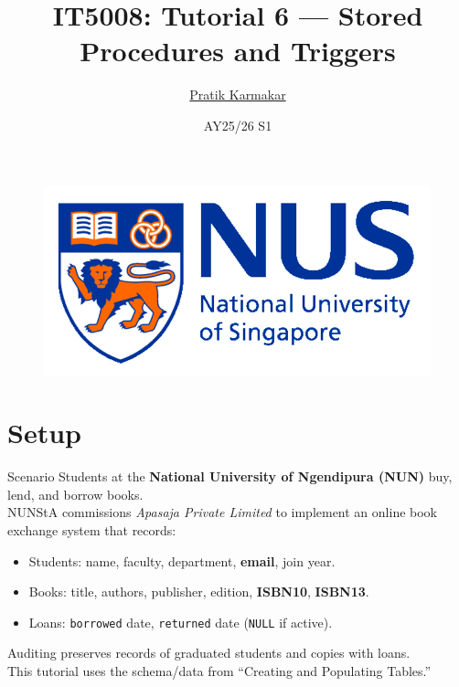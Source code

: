 \documentclass{beamer}
\author{\href{https://pratik2358.github.io/}{Pratik Karmakar}}
\title{IT5008: Tutorial 6 — Stored Procedures and Triggers}
\institute{
  School of Computing,\\
  National University of Singapore
}
\date{AY25/26 S1}
\begin{document}
\begin{frame}
  \titlepage
  \begin{figure}[htpb]
    \begin{center}
      \includegraphics[keepaspectratio, scale=0.18]{nus-logo.png}
    \end{center}
  \end{figure}
\end{frame}

\section{Setup}
\begin{frame}{Scenario}
\small
Students at the \textbf{National University of Ngendipura (NUN)} buy, lend, and borrow books.\\
NUNStA commissions \emph{Apasaja Private Limited} to implement an online book exchange system that records:
\begin{itemize}\itemsep3pt
  \item Students: name, faculty, department, \textbf{email}, join year.
  \item Books: title, authors, publisher, edition, \textbf{ISBN10}, \textbf{ISBN13}.
  \item Loans: \texttt{borrowed} date, \texttt{returned} date (\texttt{NULL} if active).
\end{itemize}
Auditing preserves records of graduated students and copies with loans.\\
This tutorial uses the schema/data from “Creating and Populating Tables.”
\end{frame}
\end{document}
